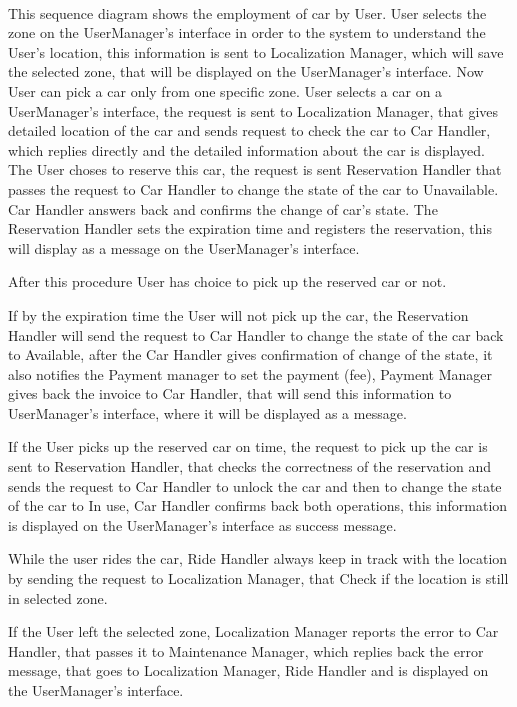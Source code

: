 		\paragraph{} This sequence diagram shows the employment of car by User.
		User selects the zone on the UserManager's interface in order to the system to understand the User's location, this information is sent to Localization Manager, which will save the selected zone, that will be displayed on the UserManager's interface. Now User can pick a car only from one specific zone. User selects a car on a UserManager's interface, the request is sent to Localization Manager, that gives detailed location of the car and sends request to check the car to Car Handler, which replies directly and the detailed information about the car is displayed. The User choses to reserve this car, the request is sent Reservation Handler that passes the request to Car Handler to change the state of the car to Unavailable. Car Handler answers back and confirms the change of car's state. The Reservation Handler sets the expiration time and registers the reservation, this will display as a message on the UserManager's interface. 
		
		After this procedure User has choice to pick up the reserved car or not.
		
		If by the expiration time the User will not pick up the car, the  Reservation Handler will send the request to Car Handler to change the state of the car back to Available, after the Car Handler gives confirmation of change of the state, it also notifies the Payment manager to set the payment (fee), Payment Manager gives back the invoice to Car Handler, that will send this information to UserManager's interface, where it will be displayed as a message.   
		
		If the User picks up the reserved car on time, the request to pick up the car is sent to Reservation Handler, that checks the correctness of the reservation and sends the request to Car Handler to unlock the car and then to change the state of the car to In use, Car Handler confirms back both operations, this information is displayed on the UserManager's interface as success message.
		
		While the user rides the car, Ride Handler always keep in track with the location by sending the request to Localization Manager, that Check if the location is still in selected zone. 
		
		If the User left the selected zone, Localization Manager reports the error to Car Handler, that passes it to Maintenance Manager, which replies back the error message, that goes to Localization Manager, Ride Handler and is displayed on the UserManager's interface.
		

